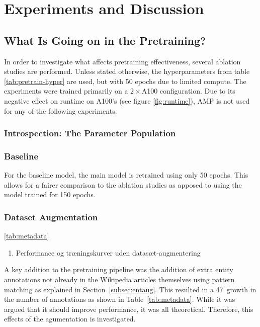 \documentclass[main.tex]{subfiles}
\begin{document}
\chapter{Experiments and Discussion}

\section{What Is Going on in the Pretraining?}
\label{sec:pretrainpls}
In order to investigate what affects pretraining effectiveness, several ablation studies are performed.
Unless stated otherwise, the hyperparameters from table \ref{tab:pretrain-hyper} are used, but with 50 epochs due to limited compute.
The experiments were trained primarily on a $ 2\times$A100 configuration.
Due to its negative effect on runtime on A100's (see figure \ref{fig:runtime}), AMP is not used for any of the following experiments.

\subsection{Introspection: The Parameter Population}

\subsection{Baseline}
For the baseline model, the main model is retrained using only 50 epochs.
This allows for a fairer comparison to the ablation studies as apposed to using the model trained for 150 epochs.

\subsection{Dataset Augmentation}

\ref{tab:metadata}
\begin{enumerate}
    \item Performance og træningskurver uden datasæt-augmentering
\end{enumerate}
A key addition to the pretraining pipeline was the addition of extra entity annotations not already in the Wikipedia articles themselves using pattern matching as explained in Section~\ref{subsec:entaug}.
This resulted in a 47\pro\ growth in the number of annotations as shown in Table~\ref{tab:metadata}.
While it was argued that it should improve performance, it was all theoretical.
Therefore, this effects of the agumentation is investigated.
\end{document}
